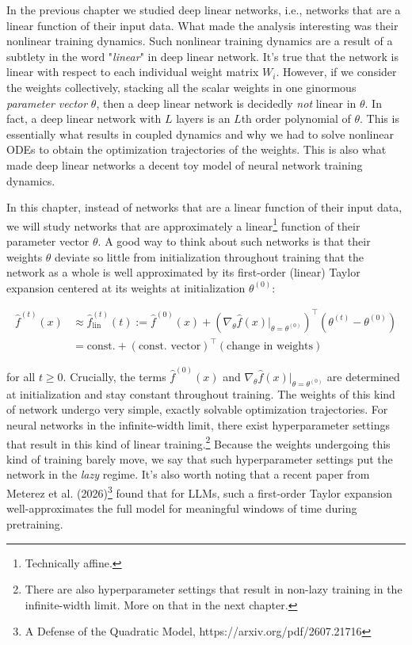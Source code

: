 In the previous chapter we studied deep linear networks, i.e., networks that are a linear function of their input data. What made the analysis interesting was their nonlinear training dynamics. Such nonlinear training dynamics are a result of a subtlety in the word "\textit{linear}" in deep linear network. It's true that the network is linear with respect to each individual weight matrix $W_i$. However, if we consider the weights collectively, stacking all the scalar weights in one ginormous \textit{parameter vector} $\theta$, then a deep linear network is decidedly \textit{not} linear in $\theta$. In fact, a deep linear network with $L$ layers is an $L$th order polynomial of $\theta$. This is essentially what results in coupled dynamics and why we had to solve nonlinear ODEs to obtain the optimization trajectories of the weights. This is also what made deep linear networks a decent toy model of neural network training dynamics. 

In this chapter, instead of networks that are a linear function of their input data, we will study networks that are approximately a linear\footnote{Technically affine.} function of their parameter vector $\theta$. A good way to think about such networks is that their weights $\theta$ deviate so little from initialization throughout training that the network as a whole is well approximated by its first-order (linear) Taylor expansion centered at its weights at initialization $\theta^{(0)}$:

\begin{align}
    \hat{f}^{(t)}(x) &\approx \hat{f}^{(t)}_{\text{lin}}(t) := \hat{f}^{(0)}(x) + \left(\nabla_{\theta} \hat{f}(x) \rvert_{\theta=\theta^{(0)}}\right)^\top (\theta^{(t)}-\theta^{(0)}) \\
    &= \text{const.} + (\text{const. vector})^{\top}(\text{change in weights}) 
\end{align}

for all $t\geq0$. Crucially, the terms $\hat{f}^{(0)}(x)$ and $\nabla_{\theta} \hat{f}(x) \rvert_{\theta=\theta^{(0)}}$ are determined at initialization and stay constant throughout training. 
The weights of this kind of network undergo very simple, exactly solvable optimization trajectories. 
For neural networks in the infinite-width limit, 
there exist hyperparameter settings
that result in this kind of linear training.\footnote{There are also hyperparameter settings that result in non-lazy training in the infinite-width limit. More on that in the next chapter.}
Because the weights undergoing this kind of training barely move,
we say that such hyperparameter settings put the network in the \textit{lazy} regime.
It's also worth noting that a recent paper from Meterez et al. (2026)\footnote{A Defense of the Quadratic Model, https://arxiv.org/pdf/2607.21716} 
found that for LLMs, such a first-order Taylor expansion well-approximates the full model
for meaningful windows of time during pretraining.

